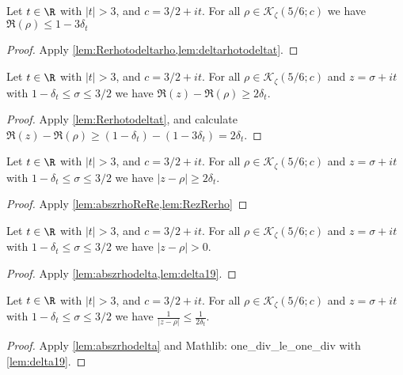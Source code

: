 \begin{lemma} \label{lem:Rerhotodeltat}  \leanok
Let $t\in\R$ with $|t|>3$, and $c=3/2+it$. For all $\rho\in\mathcal K_{\zeta}(5/6;c)$ we have $\Re(\rho) \le 1 - 3\delta_t$
\end{lemma}
\begin{proof}
\leanok
{}
Apply \cref{lem:Rerhotodeltarho,lem:deltarhotodeltat}.
\end{proof}

\begin{lemma} \label{lem:RezRerho}  \leanok
Let $t\in\R$ with $|t|>3$, and $c=3/2+it$. For all $\rho\in\mathcal K_{\zeta}(5/6;c)$ and $z=\sigma+it$ with $1-\delta_t \le \sigma \le 3/2$ we have $\Re(z) - \Re(\rho) \ge 2\delta_t$.
\end{lemma}
\begin{proof}
\leanok
Apply \cref{lem:Rerhotodeltat}, and calculate $\Re(z) - \Re(\rho) \ge (1 - \delta_t) - (1 - 3\delta_t) = 2\delta_t$.
\end{proof}

\begin{lemma} \label{lem:abszrhodelta}  \leanok
Let $t\in\R$ with $|t|>3$, and $c=3/2+it$. For all $\rho\in\mathcal K_{\zeta}(5/6;c)$ and $z=\sigma+it$ with $1-\delta_t \le \sigma \le 3/2$ we have $|z-\rho| \ge 2\delta_t$.
\end{lemma}
\begin{proof}
\leanok
Apply \cref{lem:abszrhoReRe,lem:RezRerho}
\end{proof}

\begin{lemma} \label{lem:abszrhodeltanot0}  \leanok
Let $t\in\R$ with $|t|>3$, and $c=3/2+it$. For all $\rho\in\mathcal K_{\zeta}(5/6;c)$ and $z=\sigma+it$ with $1-\delta_t \le \sigma \le 3/2$ we have $|z-\rho| > 0$.
\end{lemma}
\begin{proof}
\leanok
Apply \cref{lem:abszrhodelta,lem:delta19}.
\end{proof}

\begin{lemma} \label{lem:1abszrho}  \leanok
Let $t\in\R$ with $|t|>3$, and $c=3/2+it$. For all $\rho\in\mathcal K_{\zeta}(5/6;c)$ and $z=\sigma+it$ with $1-\delta_t \le \sigma \le 3/2$ we have $\frac{1}{|z-\rho|} \le \frac{1}{2\delta_t}$.
\end{lemma}
\begin{proof}
\leanok
Apply \cref{lem:abszrhodelta} and Mathlib: one\_div\_le\_one\_div with \cref{lem:delta19}.
\end{proof}

